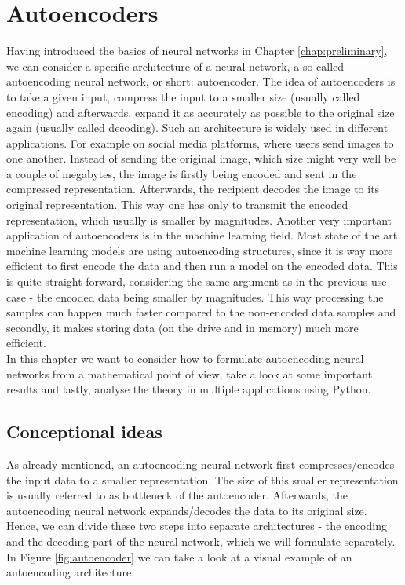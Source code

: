 \chapter{Autoencoders}\label{chap:ae}

Having introduced the basics of neural networks in Chapter \ref{chap:preliminary}, we can consider a specific architecture of a neural network, a so called autoencoding neural network, or short: autoencoder. The idea of autoencoders is to take a given input, compress the input to a smaller size (usually called encoding) and afterwards, expand it as accurately as possible to the original size again (usually called decoding). Such an architecture is widely used in different applications. For example on social media platforms, where users send images to one another. Instead of sending the original image, which size might very well be a couple of megabytes, the image is firstly being encoded and sent in the compressed representation. Afterwards, the recipient decodes the image to its original representation. This way one has only to transmit the encoded representation, which usually is smaller by magnitudes.
Another very important application of autoencoders is in the machine learning field. Most state of the art machine learning models are using autoencoding structures, since it is way more efficient to first encode the data and then run a model on the encoded data. This is quite straight-forward, considering the same argument as in the previous use case - the encoded data being smaller by magnitudes. This way processing the samples can happen much faster compared to the non-encoded data samples and secondly, it makes storing data (on the drive and in memory) much more efficient.\\
In this chapter we want to consider how to formulate autoencoding neural networks from a mathematical point of view, take a look at some important results and lastly, analyse the theory in multiple applications using Python.

\section{Conceptional ideas}

As already mentioned, an autoencoding neural network first compresses/encodes the input data to a smaller representation. The size of this smaller representation is usually referred to as bottleneck of the autoencoder.
Afterwards, the autoencoding neural network expands/decodes the data to its original size. Hence, we can divide these two steps into separate architectures - the encoding and the decoding part of the neural network, which we will formulate separately.\\
In Figure \ref{fig:autoencoder} we can take a look at a visual example of an autoencoding architecture.


